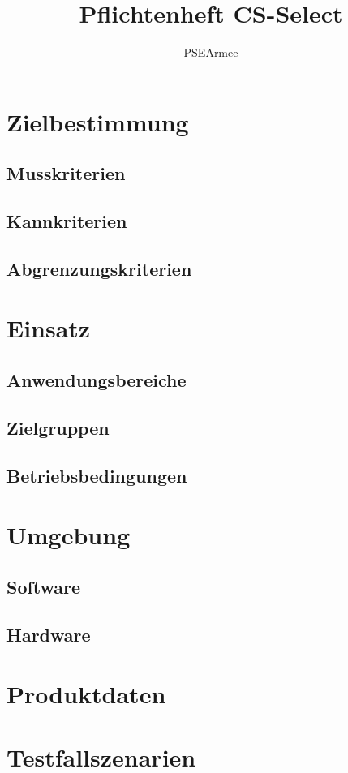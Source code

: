 \documentclass[a4paper]{scrreprt}
\begin{document}
 
\title{Pflichtenheft CS-Select}
\author{PSEArmee}
\maketitle
 
\tableofcontents
 
\chapter{Zielbestimmung}
 
\section{Musskriterien}
\begin{itemize}
\end{itemize} 
\section{Kannkriterien}
\begin{itemize}
\end{itemize} 
 
\section{Abgrenzungskriterien}
\begin{itemize}
\end{itemize} 
 
\chapter{Einsatz}
 
\section{Anwendungsbereiche}
 
\section{Zielgruppen}
 
\section{Betriebsbedingungen}
 
\chapter{Umgebung}
 
\section{Software}
 
\section{Hardware}
 
\chapter{Produktdaten}

\chapter{Testfallszenarien}
 
\end{document}
